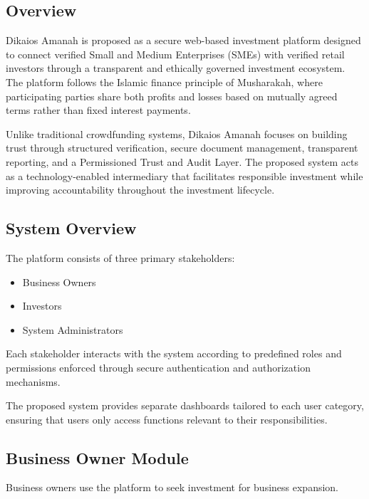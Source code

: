 \subsection{Overview}

Dikaios Amanah is proposed as a secure web-based investment platform designed to connect verified Small and Medium Enterprises (SMEs) with verified retail investors through a transparent and ethically governed investment ecosystem. The platform follows the Islamic finance principle of Musharakah, where participating parties share both profits and losses based on mutually agreed terms rather than fixed interest payments.

Unlike traditional crowdfunding systems, Dikaios Amanah focuses on building trust through structured verification, secure document management, transparent reporting, and a Permissioned Trust and Audit Layer. The proposed system acts as a technology-enabled intermediary that facilitates responsible investment while improving accountability throughout the investment lifecycle.


\subsection{System Overview}

The platform consists of three primary stakeholders:

\begin{itemize}
\item Business Owners
\item Investors
\item System Administrators
\end{itemize}

Each stakeholder interacts with the system according to predefined roles and permissions enforced through secure authentication and authorization mechanisms.

The proposed system provides separate dashboards tailored to each user category, ensuring that users only access functions relevant to their responsibilities.


\subsection{Business Owner Module}

Business owners use the platform to seek investment for business expansion.

